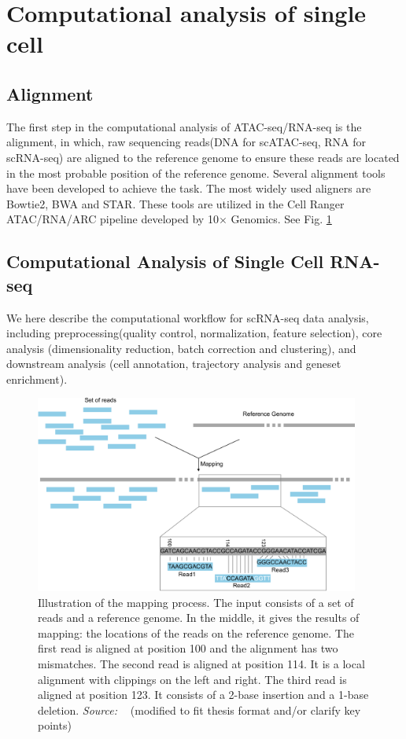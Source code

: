 \section{Computational analysis of single cell}
\label{background:computational_singlecell}
\subsection{Alignment}
\label{background:sec2:alignment}
The first step in the computational analysis of ATAC-seq/RNA-seq is the alignment,  in which, raw sequencing reads(DNA for scATAC-seq, RNA for scRNA-seq) are aligned to the reference genome to ensure these reads are located in the most probable position of the reference genome. Several alignment tools have been developed to achieve the task. The most widely used aligners are Bowtie2\citep{langmead2012bowtie2}, BWA\citep{li2009BWA} and STAR\citep{dobin2013star}.  These tools are utilized in the Cell Ranger ATAC/RNA/ARC pipeline developed by 10$\times$ Genomics. See Fig. \ref{fig:alignment}
\subsection{Computational Analysis of Single Cell RNA-seq}
\label{background:sec2:scRNA}
We here describe the computational workflow for scRNA-seq data analysis, including preprocessing(quality control, normalization, feature selection), core analysis (dimensionality reduction, batch correction and clustering), and downstream analysis (cell annotation, trajectory analysis and geneset enrichment).
\begin{figure}[!ht]
	\centering
	\includegraphics[width=0.95\textwidth]{alignment/fig}
	\vspace{0.1cm}
	\caption[DNA fragments alignment schematic.]{ Illustration of the mapping process. The input consists of a set of reads and a reference genome. In the middle, it gives the results of mapping: the locations of the reads on the reference genome. The first read is aligned at position 100 and the alignment has two mismatches. The second read is aligned at position 114. It is a local alignment with clippings on the left and right. The third read is aligned at position 123. It consists of a 2-base insertion and a 1-base deletion. \emph{Source: ~\cite{galaxyprojectSequenceAnalysis2016alignment}} (modified to fit thesis format and/or clarify key points)}
	\label{fig:alignment}
\end{figure}


